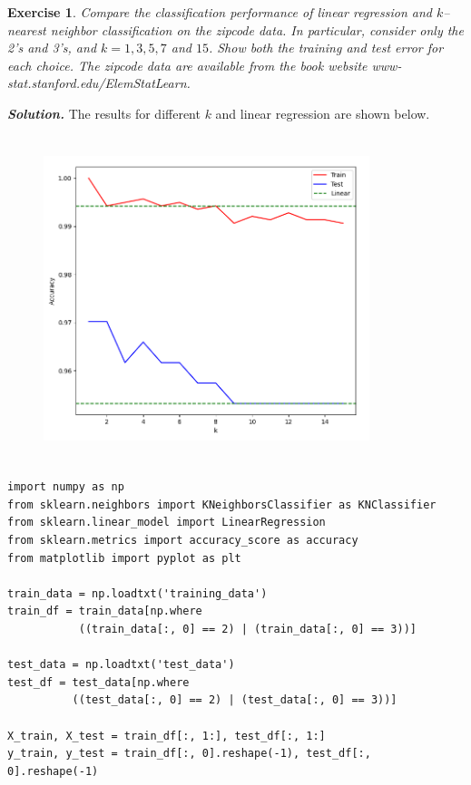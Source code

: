 \documentclass[12pt]{article}
\newtheorem{exercise}{Exercise}[section]
\newenvironment{solution}[1][\it{Solution}]{\textbf{#1. } }{\vspace{.5cm}}
\begin{document}
\begin{exercise}Compare the classification performance of linear regression and $k$–
nearest neighbor classification on the zipcode data. In particular, consider
only the 2’s and 3’s, and $k = 1, 3, 5, 7$ and $15$. Show both the training and
test error for each choice. The zipcode data are available from the book
website www-stat.stanford.edu/ElemStatLearn.
\end{exercise}
\begin{solution}
    The results for different $k$ and linear regression are shown below. 

\begin{figure}[b!]
\centering
\includegraphics[width = 9.5cm, height = 9.5cm]{fig_2.8.png}
\end{figure}

\begin{tcolorbox}[width=\linewidth, sharp corners=all, colback=white!95!black]

    \begin{verbatim}
import numpy as np
from sklearn.neighbors import KNeighborsClassifier as KNClassifier
from sklearn.linear_model import LinearRegression
from sklearn.metrics import accuracy_score as accuracy
from matplotlib import pyplot as plt

train_data = np.loadtxt('training_data')
train_df = train_data[np.where
           ((train_data[:, 0] == 2) | (train_data[:, 0] == 3))]

test_data = np.loadtxt('test_data')
test_df = test_data[np.where
          ((test_data[:, 0] == 2) | (test_data[:, 0] == 3))]

X_train, X_test = train_df[:, 1:], test_df[:, 1:]
y_train, y_test = train_df[:, 0].reshape(-1), test_df[:, 0].reshape(-1)


\end{verbatim}
\end{tcolorbox}
\end{solution}
\end{document}
